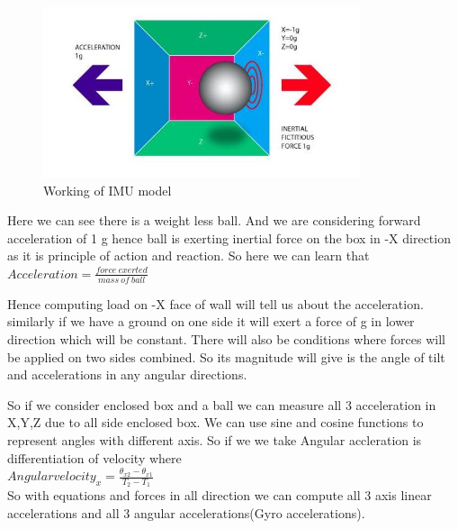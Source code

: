 \begin{figure}[!htb]
\includegraphics[width=\textwidth,height=5cm,keepaspectratio]{./figures/WorkingIMU.jpg}
\caption{Working of IMU model~\cite{StarElec}}
\label{fig:Working of IMU}
\end{figure}

Here we can see there is a weight less ball. And we are considering forward acceleration of 1 g hence ball is exerting inertial force on the box in -X direction as it is principle of action and reaction.
So here we can learn that \\

$Acceleration = \frac{force\ exerted}{mass\ of\ ball} $

Hence computing load on -X face of wall will tell us about the acceleration.
similarly if we have a ground on one side it will exert a force of g in lower direction which will be constant.
There will also be conditions where forces will be applied on two sides combined.
So its magnitude will give is the angle of tilt and accelerations in any angular directions.

So if we consider enclosed box and a ball we can measure all 3 acceleration in X,Y,Z due to all side enclosed box.
We can use sine and cosine functions to represent angles with different axis. 
So if we we take 
Angular accleration is differentiation of velocity
where\\

$Angular velocity_x= \frac{\theta_{x2} -\theta_{x1}}{T_2-T_1}$\\

So with equations and forces in all direction we can compute all 3 axis linear accelerations and all 3 angular accelerations(Gyro accelerations).